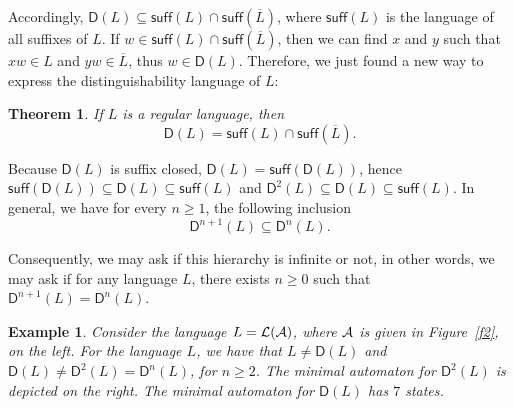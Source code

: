 \documentclass{article}
\newtheorem{theorem}{Theorem}
\newtheorem{example}{Example}
\newcommand{\comp}[1]{\overline{#1}}
\newcommand{\suff}[1]{\mathsf{suff}(#1)}
\newcommand{\dis}[1]{\mathsf{D}(#1)}
\newcommand{\disn}[2]{\mathsf{D}^{#2}(#1)}
\newcommand{\lang}[1]{{\cal L}(#1)}
\begin{document}
 Accordingly,
$\dis{L}\subseteq \suff{L}\cap \suff{\comp{L}}$, where $\suff{L}$ is
the language of all suffixes of $L$. 
If $w \in \suff{L}\cap \suff{\comp{L}}$, then we can find $x$ and $y$ such that
$xw\in L$ and $yw\in \comp{L}$, thus $w\in \dis{L}$.
Therefore, we just found a new way to express the distinguishability
language of $L$: 

\begin{theorem}
\label{theo:dss} If $L$ is a regular language, then
\begin{equation}
\label{eq:dss}  
\dis{L}=\suff{L}\cap\suff{\comp{L}}.
\end{equation}
\end{theorem}

Because $\dis{L}$ is suffix closed,  $\dis{L}=\suff{\dis{L}}$, hence
$\suff{\dis{L}}\subseteq \dis{L}\subseteq \suff{L}$ and
$\disn{L}{2}\subseteq \dis{L}\subseteq \suff{L}$. 
In general, we have for every $n\geq 1$, the following inclusion
\begin{equation}
\label{eqchain}
\disn{L}{n+1}\subseteq \disn{L}{n}. 
\end{equation}

Consequently, we may ask if this hierarchy is infinite or not, in other words, 
we may ask if for any language $L$,
there exists $n\geq 0$ such that $\disn{L}{n+1}= \disn{L}{n}$. 

\begin{example}
\label{ex:d3}
Consider the language $L=\lang{\cal A}$, where ${\cal A}$ is given 
in Figure~\ref{f2}, on the left. For the language $L$, we have that $L\neq \dis{L}$ and 
 $\dis{L}\neq\disn{L}{2}=\disn{L}{n}$, for $n\geq 2$. 
The minimal automaton for  $\disn{L}{2}$ is depicted on the right. 
The minimal automaton for $\dis{L}$ has $7$ states.
\end{example}
\end{document}
